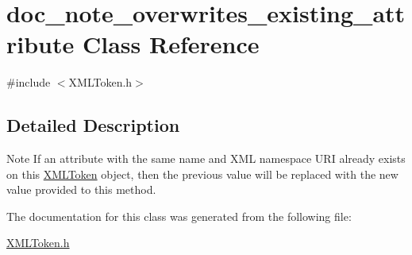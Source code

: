 \hypertarget{classdoc__note__overwrites__existing__attribute}{}\section{doc\+\_\+note\+\_\+overwrites\+\_\+existing\+\_\+attribute Class Reference}
\label{classdoc__note__overwrites__existing__attribute}


{\ttfamily \#include $<$X\+M\+L\+Token.\+h$>$}



\subsection{Detailed Description}
\begin{DoxyNote}{Note}
If an attribute with the same name and X\+ML namespace U\+RI already exists on this \hyperlink{class_x_m_l_token}{X\+M\+L\+Token} object, then the previous value will be replaced with the new value provided to this method. 
\end{DoxyNote}


The documentation for this class was generated from the following file\+:\begin{DoxyCompactItemize}
\item 
\hyperlink{_x_m_l_token_8h}{X\+M\+L\+Token.\+h}\end{DoxyCompactItemize}
